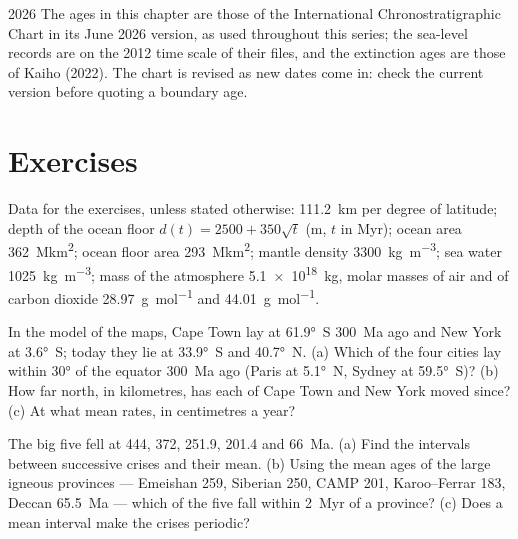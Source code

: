 \begin{dated}{2026}
The ages in this chapter are those of the International Chronostratigraphic Chart in its June
2026 version, as used throughout this series; the sea-level records are on the 2012 time scale
of their files, and the extinction ages are those of Kaiho (2022). The chart is revised as new
dates come in: check the current version before quoting a boundary age.
\end{dated}

\section*{Exercises}\label{sec:b2:phanerozoic-earth:exercises}

Data for the exercises, unless stated otherwise: \qty{111.2}{km} per degree of latitude; depth
of the ocean floor $d(t) = 2500 + 350\sqrt t$ (\unit{m}, $t$ in \unit{Myr}); ocean area
\qty{362}{\mega km^2}; ocean floor area \qty{293}{\mega km^2}; mantle density
\qty{3300}{kg.m^{-3}}; sea water \qty{1025}{kg.m^{-3}}; mass of the atmosphere
\qty{5.1e18}{kg}, molar masses of air and of carbon dioxide \qty{28.97}{g.mol^{-1}} and
\qty{44.01}{g.mol^{-1}}.

\begin{exercise}[$\star$]\label{exo:b2:phanerozoic-earth:1}
In the model of the maps, Cape Town lay at \ang{61.9}~S \qty{300}{Ma} ago and New York at
\ang{3.6}~S; today they lie at \ang{33.9}~S and \ang{40.7}~N. (a) Which of the four cities lay
within \ang{30} of the equator \qty{300}{Ma} ago (Paris at \ang{5.1}~N, Sydney at
\ang{59.5}~S)? (b) How far north, in kilometres, has each of Cape Town and New York moved since?
(c) At what mean rates, in centimetres a year?
\end{exercise}

\begin{exercise}[$\star$]\label{exo:b2:phanerozoic-earth:2}
The big five fell at 444, 372, 251.9, 201.4 and \qty{66}{Ma}. (a) Find the intervals between
successive crises and their mean. (b) Using the mean ages of the large igneous provinces ---
Emeishan 259, Siberian 250, CAMP 201, Karoo--Ferrar 183, Deccan \qty{65.5}{Ma} --- which of the
five fall within \qty{2}{Myr} of a province? (c) Does a mean interval make the crises periodic?
\end{exercise}

